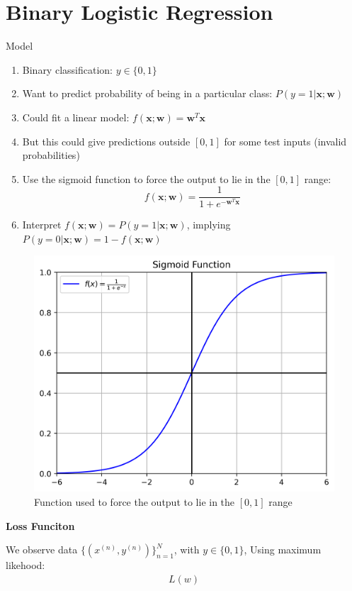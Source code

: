 \documentclass[a4paper, 11pt]{article}
\begin{document}
\section{Binary Logistic Regression}
\begin{center}
        \Large Model
\end{center}

\begin{enumerate}
        \item Binary classification: $y\in\{0,1\}$
        \item Want to predict probability of being in a particular class: $P(y = 1|\mathbf{x};\mathbf{w})$
        \item Could fit a linear model: $f(\mathbf{x};\mathbf{w}) = \mathbf{w}^{T}\mathbf{x}$
        \item But this could give predictions outside $[0,1]$ for some test inputs (invalid probabilities)
        \item Use the sigmoid function to force the output to lie in the $[0,1]$ range:\[f(\mathbf{x};\mathbf{w}) = \frac{1}{1 + e^{-\mathbf{w}^{T}\mathbf{x}}}\]
        \item Interpret $f(\mathbf{x}; \mathbf{w}) = P(y = 1|\mathbf{x};\mathbf{w})$, implying $P(y = 0|\mathbf{x};\mathbf{w}) = 1 - f(\mathbf{x};\mathbf{w})$
\end{enumerate}

\begin{figure}[H]
        \centering
        \includegraphics[scale=0.8]{sigmoid.png}
        \caption{Function used to force the output to lie in the $[0,1]$ range}
        \label{fig: Sigmoid Function}
\end{figure}
\newpage
{\Large \textbf{Loss Funciton}}


We observe data $\{(x^{(n)}, y^{(n)})\}_{n = 1}^{N}$, with $y\in\{0, 1\}$, Using maximum likehood:
\begin{align*}
        L(w)
\end{align*}
\end{document}
